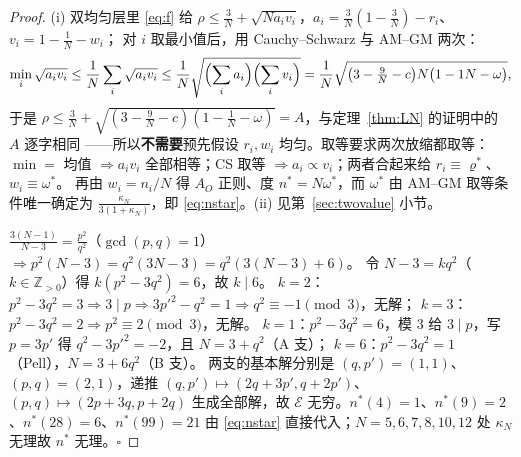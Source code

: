 \documentclass[UTF8,11pt]{ctexart}
\theoremstyle{definition}
\newcommand{\Z}{\mathbb{Z}}
\begin{document}
\begin{proof}
(i) 双均匀层里 \eqref{eq:f} 给 $\rho\le\frac3N+\sqrt{N a_iv_i}$，$a_i=\frac3N(1-\frac3N)-r_i$、$v_i=1-\frac1N-w_i$；
对 $i$ 取最小值后，用 Cauchy--Schwarz 与 AM--GM 两次：
\[
\min_i\sqrt{a_iv_i}\le\frac1N\sum_i\sqrt{a_iv_i}\le\frac1N\sqrt{\Bigl(\sum_ia_i\Bigr)\Bigl(\sum_iv_i\Bigr)}
=\frac1N\sqrt{\bigl(3-{\textstyle\frac9N}-c\bigr)N\bigl(1-{\textstyle1N}-\omega\bigr)},
\]
于是 $\rho\le\frac3N+\sqrt{(3-\frac9N-c)(1-\frac1N-\omega)}=A$，与定理~\ref{thm:LN} 的证明中的 $A$ 逐字相同
——所以\textbf{不需要}预先假设 $r_i,w_i$ 均匀。取等要求两次放缩都取等：
$\min=$ 均值 $\Rightarrow a_iv_i$ 全部相等；CS 取等 $\Rightarrow a_i\propto v_i$；两者合起来给 $r_i\equiv\varrho^*$、$w_i\equiv\omega^*$。
再由 $w_i=n_i/N$ 得 $A_O$ 正则、度 $n^*=N\omega^*$，而 $\omega^*$ 由 AM--GM 取等条件唯一确定为
$\frac{\kappa_N}{3(1+\kappa_N)}$，即 \eqref{eq:nstar}。(ii) 见第~\ref{sec:twovalue} 小节。

$\frac{3(N-1)}{N-3}=\frac{p^2}{q^2}$（$\gcd(p,q)=1$）$\Rightarrow p^2(N-3)=q^2(3N-3)=q^2(3(N-3)+6)$。
令 $N-3=kq^2$（$k\in\Z_{>0}$）得 $k(p^2-3q^2)=6$，故 $k\mid6$。
$k=2$：$p^2-3q^2=3\Rightarrow3\mid p\Rightarrow3p'^2-q^2=1\Rightarrow q^2\equiv-1\pmod3$，无解；
$k=3$：$p^2-3q^2=2\Rightarrow p^2\equiv2\pmod3$，无解。
$k=1$：$p^2-3q^2=6$，模 $3$ 给 $3\mid p$，写 $p=3p'$ 得 $q^2-3p'^2=-2$，且 $N=3+q^2$（A 支）；
$k=6$：$p^2-3q^2=1$（Pell），$N=3+6q^2$（B 支）。
两支的基本解分别是 $(q,p')=(1,1)$、$(p,q)=(2,1)$，递推 $(q,p')\mapsto(2q+3p',q+2p')$、
$(p,q)\mapsto(2p+3q,p+2q)$ 生成全部解，故 $\mathcal E$ 无穷。$n^*(4)=1$、$n^*(9)=2$、$n^*(28)=6$、$n^*(99)=21$
由 \eqref{eq:nstar} 直接代入；$N=5,6,7,8,10,12$ 处 $\kappa_N$ 无理故 $n^*$ 无理。$\square$
\end{proof}
\end{document}
